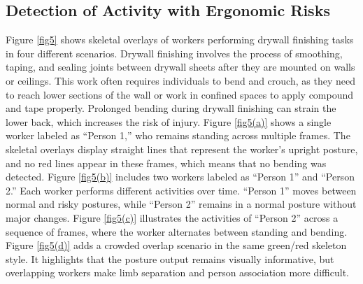 \documentclass[11pt]{article}
\begin{document}
 \subsection{Detection of Activity with Ergonomic Risks}


Figure \ref{fig5} shows skeletal overlays of workers performing drywall finishing tasks in four different scenarios. Drywall finishing involves the process of smoothing, taping, and sealing joints between drywall sheets after they are mounted on walls or ceilings. This work often requires individuals to bend and crouch, as they need to reach lower sections of the wall or work in confined spaces to apply compound and tape properly. Prolonged bending during drywall finishing can strain the lower back, which increases the risk of injury. Figure \ref{fig5(a)} shows a single worker labeled as ``Person 1,'' who remains standing across multiple frames. The skeletal overlays display straight lines that represent the worker's upright posture, and no red lines appear in these frames, which means that no bending was detected. Figure \ref{fig5(b)} includes two workers labeled as ``Person 1'' and ``Person 2.'' Each worker performs different activities over time. ``Person 1'' moves between normal and risky postures, while ``Person 2'' remains in a normal posture without major changes. Figure \ref{fig5(c)} illustrates the activities of ``Person 2'' across a sequence of frames, where the worker alternates between standing and bending. Figure \ref{fig5(d)} adds a crowded overlap scenario in the same green/red skeleton style. It highlights that the posture output remains visually informative, but overlapping workers make limb separation and person association more difficult.
\end{document}
